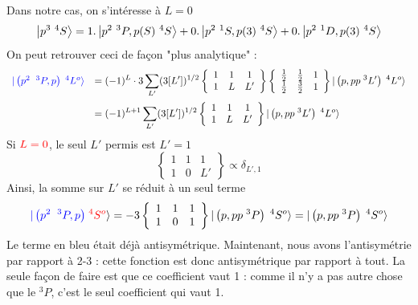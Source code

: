 Dans notre cas, on s'intéresse à $L=0$
\begin{equation}
\ket{p^3\ ^4S} =1.\ket{p^2\ ^3P,p(S)\ ^4S}  + 0. \ket{p^2\ ^1S,p(3)\ ^4S} + 0.\ket{p^2\ ^1D,p(3)\ 
^4S}
\end{equation}
On peut retrouver ceci de façon "plus analytique" :
\begin{equation}
\begin{array}{ll}
 {\color{blue}
\vert \left( p^{2} \; \; ^3P, p \right) \; ^4 L^o \rangle  }
 &\DS= (-1)^{L} \cdot 3 \sum_{L'} (3[ L'])^{1/2} 
\left\{ 
\begin{array}{ccc}
1 & 1 & 1 \\
1 & L & L'
\end{array}
\right\}
\left\{ 
\begin{array}{ccc}
\frac{1}{2} & \frac{1}{2} & 1 \\
\frac{1}{2} & \frac{3}{2} & 1
\end{array}
\right\}
\vert \left( p, pp  \; ^3L' \right) \; ^4L^o \rangle\vspace{2mm}\\
&\DS =
(-1)^{L+1 } \sum_{L'} (3[ L'])^{1/2} 
\left\{ 
\begin{array}{ccc}
1 & 1 & 1 \\
1 & L & L'
\end{array}
\right\}
\vert \left( p, pp  \; ^3L' \right) \; ^4L^o \rangle
\end{array}
\end{equation}
Si ${\color{red} L=0}$, le seul $L'$ permis est $L'=1$
\begin{equation}
\left\{ 
\begin{array}{ccc}
1 & 1 & 1 \\
1 & 0  & L'
\end{array}
\right\}
\propto \delta_{L',1}
\end{equation}
Ainsi, la somme sur $L'$ se réduit à un seul terme
\begin{equation}
 {\color{blue}
\vert \left( p^{2} \; \; ^3P, p \right)  }\;  {\color{red}^4 S^o}
 \rangle 
= -3 
\left\{ 
\begin{array}{ccc}
1 & 1 & 1 \\
1 & 0 & 1
\end{array}
\right\}
\vert \left( p, pp  \; ^3P \right) \; ^4S^o \rangle  
= \vert \left( p, pp  \; ^3P \right) \; ^4S^o \rangle
\end{equation}
Le terme en bleu était déjà antisymétrique. Maintenant, nous avons l'antisymétrie par rapport
à 2-3 : cette fonction est donc antisymétrique par rapport à tout. La seule façon de faire est
que ce coefficient vaut 1 : comme il n'y a pas autre chose que le $^3P$, c'est le seul coefficient
qui vaut 1. \\


